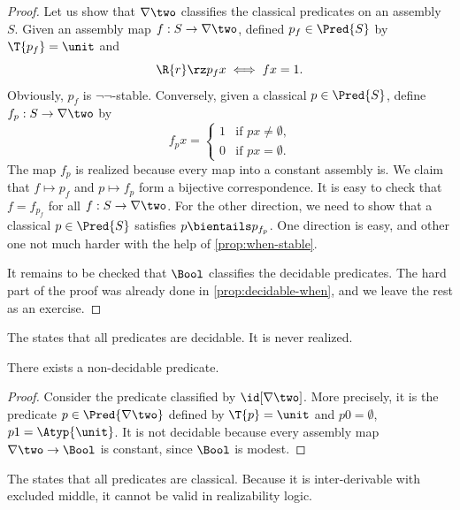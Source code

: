\begin{proof}
  Let us show that $\nabla \two$ classifies the classical predicates on an assembly~$S$.
  Given an assembly map $f : S \to \nabla \two$, defined $p_f \in \Pred{S}$ by $\T{p_f} = \unit$ and
  \begin{equation*}
    \R{r} \rz p_f x
    \iff
    f x = 1.
  \end{equation*}
  Obviously, $p_f$ is $\neg\neg$-stable. Conversely, given a classical $p \in \Pred{S}$, define $f_p : S \to \nabla \two$ by
  \begin{equation*}
    f_p x =
    \begin{cases}
      1 & \text{if $p x \neq \emptyset$,} \\
      0 & \text{if $p x = \emptyset$.}
    \end{cases}
  \end{equation*}
  The map $f_p$ is realized because every map into a constant assembly is.
  We claim that $f \mapsto p_f$ and $p \mapsto f_p$ form a bijective correspondence.
  It is easy to check that $f = f_{p_f}$ for all $f : S \to \nabla \two$.
  For the other direction, we need to show that a classical $p \in \Pred{S}$ satisfies $p \bientails p_{f_p}$. One direction is easy, and other one not much harder with the help of \cref{prop:when-stable}.

  It remains to be checked that $\Bool$ classifies the decidable predicates.
  The hard part of the proof was already done in \cref{prop:decidable-when}, and we leave the rest as an exercise.
\end{proof}

The  states that all predicates are decidable. It is never realized.

\begin{proposition}
  There exists a non-decidable predicate.
\end{proposition}

\begin{proof}
  Consider the predicate classified by $\id[\nabla \two]$.
  More precisely, it is the predicate $p \in \Pred{\nabla \two}$ defined by
  $\T{p} = \unit$ and $p 0 = \emptyset$, $p 1 = \Atyp{\unit}$.
  It is not decidable because every assembly map $\nabla \two \to \Bool$ is constant, since $\Bool$ is modest.
\end{proof}

The  states that all predicates are classical. Because it is inter-derivable with excluded middle, it cannot be valid in realizability logic.

